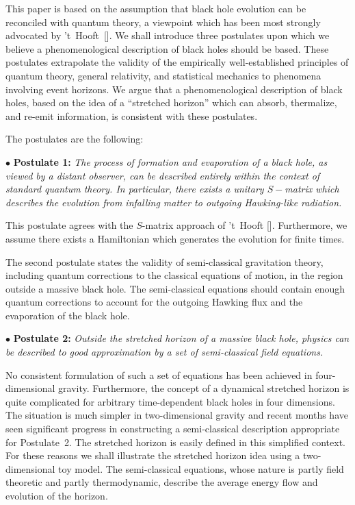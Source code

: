This paper is based on the assumption that black hole evolution can
be reconciled with quantum theory,  a viewpoint which has been most
strongly advocated by 't~Hooft~[\tHooftone].  We shall introduce three postulates upon which we
believe a phenomenological description of black holes should be
based.  These postulates extrapolate the validity of the empirically
well-established principles of quantum theory, general relativity,
and statistical mechanics to phenomena involving event horizons.  We
argue that a phenomenological description of black holes, based on
the idea of a ``stretched horizon'' which can absorb,
thermalize, and re-emit information, is consistent with these
postulates.

The postulates are the following:

$\bullet$ {\bf Postulate 1:}  {\it The process of formation and
evaporation of a black hole, as viewed by a distant observer, can be
described entirely within the context of standard quantum theory.  In
particular, there exists a unitary $S-$matrix which describes the
evolution from infalling matter to outgoing Hawking-like radiation.}

This postulate agrees with the $S$-matrix approach of 't~Hooft
[\tHooftone].  Furthermore, we assume there exists a Hamiltonian
which generates the evolution for finite times.

The second postulate states the validity of semi-classical
gravitation theory,
including quantum corrections to the classical equations of motion,
in the region outside a massive black hole.  The semi-classical
equations should contain enough quantum corrections to account for
the outgoing Hawking flux and the evaporation of the black hole.

$\bullet$ {\bf Postulate 2:}  {\it Outside the stretched horizon of a
massive black hole, physics can be described to good approximation by
a set of semi-classical field equations.}

No consistent formulation of such a set of equations has been
achieved in four-dimensional gravity.  Furthermore, the concept of a
dynamical stretched horizon is quite complicated for arbitrary
time-dependent black holes in four dimensions.   The situation is
much simpler in two-dimensional gravity and recent months have seen
significant progress in constructing a semi-classical description
appropriate for Postulate~2.  The stretched horizon is easily defined
in this simplified context.  For these reasons we shall illustrate
the stretched horizon idea using a two-dimensional toy model.   The
semi-classical equations, whose nature is partly field theoretic and
partly thermodynamic, describe the average energy flow and evolution
of the horizon.

